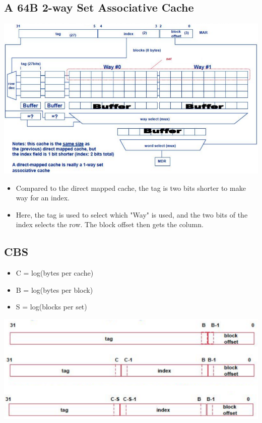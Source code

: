 \documentclass[10pt]{article}
\begin{document}
\subsection*{A 64B 2-way Set Associative Cache}
\begin{center}
    \includegraphics*[scale=0.8]{W7_2.png}
\end{center}
\begin{itemize}
    \item Compared to the direct mapped cache, the tag is two bits shorter to make way for an index.
    \item Here, the tag is used to select which "Way" is used, and the two bits of the index selects the row.  The block offset then gets the column.
\end{itemize}

\subsection*{CBS}
\begin{itemize}
    \item C = log(bytes per cache)
    \item B = log(bytes per block)
    \item S = log(blocks per set)
\end{itemize}
\begin{center}
    \includegraphics*[scale=0.9]{W7_3.png}
\end{center}
\end{document}
